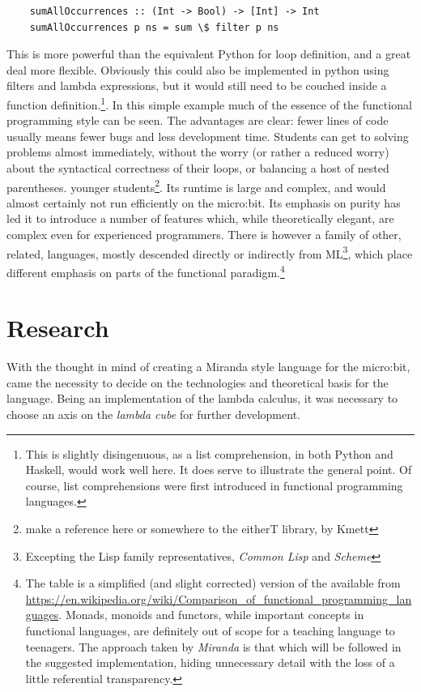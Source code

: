 \documentclass[12pt, a4paper]{report}
\begin{document}
\begin{verbatim}
    sumAllOccurrences :: (Int -> Bool) -> [Int] -> Int
    sumAllOccurrences p ns = sum \$ filter p ns
\end{verbatim}

This is more powerful than the equivalent Python for loop definition, and a great deal more
flexible. Obviously this could also be implemented in python using filters and lambda expressions,
but it would still need to be couched inside a function definition.\footnote{This is slightly
disingenuous, as a list comprehension, in both Python and Haskell, would work well here. It does
serve to illustrate the general point. Of course, list comprehensions were first introduced in
functional programming languages.}. In this simple example much of the essence of the functional
programming style can be seen. The advantages are clear: fewer lines of code usually means fewer
bugs and less development time. Students can get to solving problems almost immediately, without the
worry (or rather a reduced worry) about the syntactical correctness of their loops, or balancing
a host of nested parentheses. %
younger students\footnote{make a reference here or somewhere to the eitherT library, by Kmett}.
Its runtime is large and complex, and would almost certainly not run efficiently on the micro:bit.
Its emphasis on purity has led it to introduce a number of features which, while theoretically
elegant, are complex even for experienced programmers. There is however a family of other, related,
languages, mostly descended directly or indirectly from ML\footnote{Excepting the Lisp family
representatives, \textit{Common Lisp} and \textit{Scheme}}, which place different emphasis on parts
of the functional paradigm.\footnote{The table is a simplified (and slight corrected) version of the
available from \url{https://en.wikipedia.org/wiki/Comparison_of_functional_programming_languages}.
Monads, monoids and functors, while important concepts in functional languages, are definitely out
of scope for a teaching language to teenagers. The approach taken by \textit{Miranda} is that which
will be followed in the suggested implementation, hiding unnecessary detail with the loss of a
little referential transparency.}

\section{Research}
With the thought in mind of creating a Miranda style language for the micro:bit, came the necessity
to decide on the technologies and theoretical basis for the language. Being an implementation of the
lambda calculus, it was necessary to choose an axis on the \textit{lambda cube} for further
development. 
\end{document}
